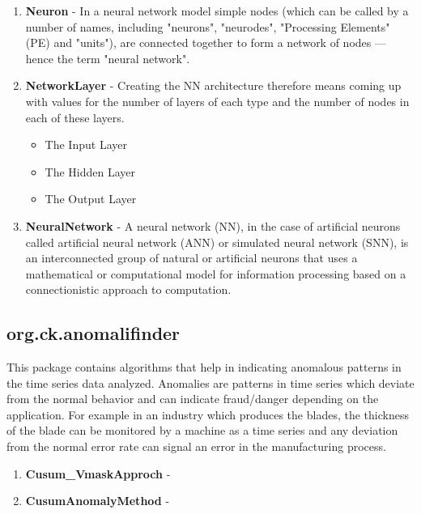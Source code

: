 \documentclass[12pt]{report}
\begin{document}
\begin{enumerate}

\item{\textbf{Neuron} - In a neural network model simple nodes (which can be called by a number of names, including "neurons", "neurodes", "Processing Elements" (PE) and "units"), are connected together to form a network of nodes — hence the term "neural network".}
\item{\textbf{NetworkLayer} - Creating the NN architecture therefore means coming up with values for the number of layers of each type and the number of nodes in each of these layers.

\begin{itemize}
\item{The Input Layer}
\item{The Hidden Layer}
\item{The Output Layer}
\end{itemize}

}
\item{\textbf{NeuralNetwork} - A neural network (NN), in the case of artificial neurons called artificial neural network (ANN) or simulated neural network (SNN), is an interconnected group of natural or artificial neurons that uses a mathematical or computational model for information processing based on a connectionistic approach to computation.}


\end{enumerate}

\subsection{org.ck.anomalifinder}
This package contains algorithms that help in indicating anomalous patterns in the time series data analyzed. Anomalies are patterns in time series which deviate from the normal behavior and can indicate fraud/danger depending on the application. For example in an industry which produces the blades, the thickness of the blade can be monitored by a machine as a time series and any deviation from the normal error rate can signal an error in the manufacturing process.

\begin{enumerate}

\item{\textbf{Cusum\_VmaskApproch} - }

\item{\textbf{CusumAnomalyMethod} - }

\end{enumerate}
\end{document}
